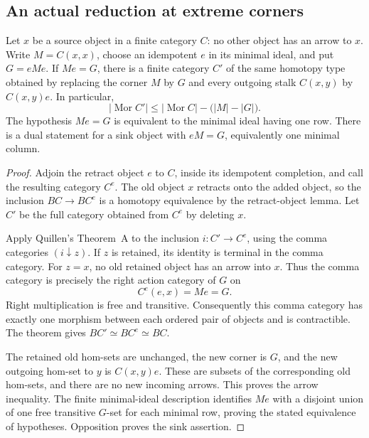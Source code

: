 \subsection{An actual reduction at extreme corners}

\begin{lemma}
\label{CP2:A-extreme-minimal-group-reduction}
Let $x$ be a source object in a finite category $C$: no other
object has an arrow to $x$. Write $M=C(x,x)$, choose an
idempotent $e$ in its minimal ideal, and put $G=eMe$.
If $Me=G$, there is a finite category $C'$ of the same
homotopy type obtained by replacing the corner $M$ by $G$
and every outgoing stalk $C(x,y)$ by $C(x,y)e$. In particular,
\[
 |\operatorname{Mor}C'|\leq
 |\operatorname{Mor}C|-\bigl(|M|-|G|\bigr).
\]
The hypothesis $Me=G$ is equivalent to the minimal ideal
having one row. There is a dual statement for a sink object
with $eM=G$, equivalently one minimal column.
\end{lemma}
\begin{proof}
Adjoin the retract object $e$ to $C$, inside its idempotent
completion, and call the resulting category $C^e$. The old
object $x$ retracts onto the added object, so the inclusion
$BC\to BC^e$ is a homotopy equivalence by the retract-object
lemma. Let $C'$ be the full category obtained from $C^e$
by deleting $x$.

Apply Quillen's Theorem~A to the inclusion $i:C'\to C^e$,
using the comma categories $(i\downarrow z)$. If $z$ is
retained, its identity is terminal in the comma category.
For $z=x$, no old retained object has an arrow into $x$.
Thus the comma category is precisely the right action
category of $G$ on
\[
 C^e(e,x)=Me=G.
\]
Right multiplication is free and transitive. Consequently
this comma category has exactly one morphism between each
ordered pair of objects and is contractible. The theorem
gives $BC'\simeq BC^e\simeq BC$.

The retained old hom-sets are unchanged, the new corner is
$G$, and the new outgoing hom-set to $y$ is $C(x,y)e$.
These are subsets of the corresponding old hom-sets, and
there are no new incoming arrows. This proves the arrow
inequality. The finite minimal-ideal description identifies
$Me$ with a disjoint union of one free transitive $G$-set
for each minimal row, proving the stated equivalence of
hypotheses. Opposition proves the sink assertion.
\end{proof}

